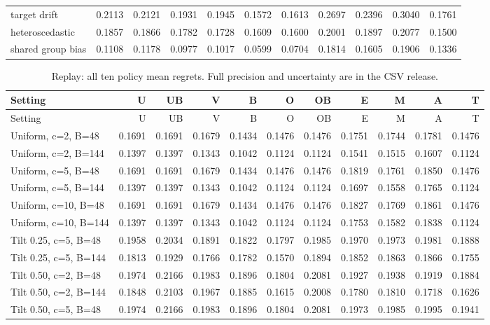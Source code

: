 \begin{landscape}
\begin{longtable}{lrrrrrrrrrr}
target drift & 0.2113 & 0.2121 & 0.1931 & 0.1945 & 0.1572 & 0.1613 & 0.2697 & 0.2396 & 0.3040 & 0.1761 \\
heteroscedastic & 0.1857 & 0.1866 & 0.1782 & 0.1728 & 0.1609 & 0.1600 & 0.2001 & 0.1897 & 0.2077 & 0.1500 \\
shared group bias & 0.1108 & 0.1178 & 0.0977 & 0.1017 & 0.0599 & 0.0704 & 0.1814 & 0.1605 & 0.1906 & 0.1336 \\
\bottomrule
\end{longtable}
\small
{}
\begin{longtable}{lrrrrrrrrrr}
\caption{Replay: all ten policy mean regrets. Full precision and uncertainty are in the CSV release.}\\
\toprule
Setting & U & UB & V & B & O & OB & E & M & A & T \\
\midrule
\endfirsthead
\toprule
Setting & U & UB & V & B & O & OB & E & M & A & T \\
\midrule
\endhead
Uniform, c=2, B=48 & 0.1691 & 0.1691 & 0.1679 & 0.1434 & 0.1476 & 0.1476 & 0.1751 & 0.1744 & 0.1781 & 0.1476 \\
Uniform, c=2, B=144 & 0.1397 & 0.1397 & 0.1343 & 0.1042 & 0.1124 & 0.1124 & 0.1541 & 0.1515 & 0.1607 & 0.1124 \\
Uniform, c=5, B=48 & 0.1691 & 0.1691 & 0.1679 & 0.1434 & 0.1476 & 0.1476 & 0.1819 & 0.1761 & 0.1850 & 0.1476 \\
Uniform, c=5, B=144 & 0.1397 & 0.1397 & 0.1343 & 0.1042 & 0.1124 & 0.1124 & 0.1697 & 0.1558 & 0.1765 & 0.1124 \\
Uniform, c=10, B=48 & 0.1691 & 0.1691 & 0.1679 & 0.1434 & 0.1476 & 0.1476 & 0.1827 & 0.1769 & 0.1861 & 0.1476 \\
Uniform, c=10, B=144 & 0.1397 & 0.1397 & 0.1343 & 0.1042 & 0.1124 & 0.1124 & 0.1753 & 0.1582 & 0.1838 & 0.1124 \\
Tilt 0.25, c=5, B=48 & 0.1958 & 0.2034 & 0.1891 & 0.1822 & 0.1797 & 0.1985 & 0.1970 & 0.1973 & 0.1981 & 0.1888 \\
Tilt 0.25, c=5, B=144 & 0.1813 & 0.1929 & 0.1766 & 0.1782 & 0.1570 & 0.1894 & 0.1852 & 0.1863 & 0.1866 & 0.1755 \\
Tilt 0.50, c=2, B=48 & 0.1974 & 0.2166 & 0.1983 & 0.1896 & 0.1804 & 0.2081 & 0.1927 & 0.1938 & 0.1919 & 0.1884 \\
Tilt 0.50, c=2, B=144 & 0.1848 & 0.2103 & 0.1967 & 0.1885 & 0.1615 & 0.2008 & 0.1780 & 0.1810 & 0.1718 & 0.1626 \\
Tilt 0.50, c=5, B=48 & 0.1974 & 0.2166 & 0.1983 & 0.1896 & 0.1804 & 0.2081 & 0.1973 & 0.1985 & 0.1995 & 0.1941 \\

\end{longtable}
\end{landscape}
